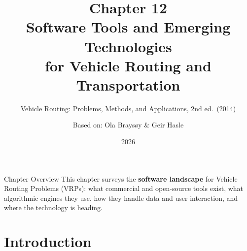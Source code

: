 \documentclass[aspectratio=169,10pt]{beamer}
\title[Ch.\ 12: VRP Software \& Emerging Tech]{%
  \textbf{Chapter 12}\\
  Software Tools and Emerging Technologies\\
  for Vehicle Routing and Transportation}
\subtitle{Vehicle Routing: Problems, Methods, and Applications, 2nd ed.\ (2014)}
\author{Based on: Ola Brays{\o}y \& Geir Hasle}
\institute{Slides prepared for self-contained study}
\date{2026}
\begin{document}

\begin{frame}
  \titlepage
\end{frame}

\begin{frame}[allowframebreaks]{Chapter Overview}
  This chapter surveys the \textbf{software landscape} for Vehicle Routing Problems
  (VRPs): what commercial and open-source tools exist, what algorithmic engines they
  use, how they handle data and user interaction, and where the technology is heading.

  \tableofcontents[hideallsubsections]
\end{frame}


\section{Introduction}
\end{document}
